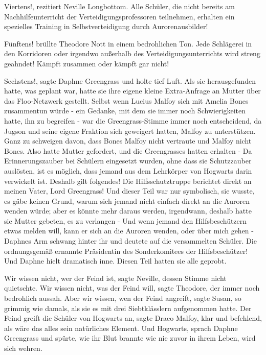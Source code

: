 \glqq{}Viertens!\grqq{}, rezitiert Neville Longbottom. \glqq{}Alle Schüler, die
nicht bereits am Nachhilfeunterricht der Verteidigungsprofessoren teilnehmen,
erhalten ein spezielles Training in Selbstverteidigung durch
Aurorenausbilder!\grqq{}

\glqq{}Fünftens!\grqq{} brüllte Theodore Nott in einem bedrohlichen Ton. \glqq{}
Jede Schlägerei in den Korridoren oder irgendwo außerhalb des
Verteidigungsunterrichts wird streng geahndet! Kämpft zusammen oder kämpft gar
nicht!\grqq{}

\glqq{}Sechstens!\grqq{}, sagte Daphne Greengrass und holte tief Luft. Als sie
herausgefunden hatte, was geplant war, hatte sie ihre eigene kleine
Extra-Anfrage an Mutter über das Floo-Netzwerk gestellt. Selbst wenn Lucius
Malfoy sich mit Amelia Bones zusammentun würde - ein Gedanke, mit dem sie immer
noch Schwierigkeiten hatte, ihn zu begreifen - war die Greengrass-Stimme immer
noch entscheidend, da Jugson und seine eigene Fraktion sich geweigert hatten,
Malfoy zu unterstützen. Ganz zu schweigen davon, dass Bones Malfoy nicht
vertraute und Malfoy nicht Bones. Also hatte Mutter gefordert, und die
Greengrasses hatten erhalten - \glqq{}Da Erinnerungszauber bei Schülern
eingesetzt wurden, ohne dass sie Schutzzauber auslösten, ist es möglich, dass
jemand aus dem Lehrkörper von Hogwarts darin verwickelt ist. Deshalb gilt
folgendes! Die Hilfsschutztruppe berichtet direkt an meinen Vater, Lord
Greengrass!\grqq{} Und dieser Teil war nur symbolisch, sie wusste, es gäbe
keinen Grund, warum sich jemand nicht einfach direkt an die Auroren wenden
würde; aber es könnte mehr daraus werden, irgendwann, deshalb hatte sie Mutter
gebeten, es zu verlangen - \glqq{}Und wenn jemand den Hilfsbeschützern etwas
melden will, kann er sich an die Auroren wenden, oder über mich gehen -\grqq{}
Daphnes Arm schwang hinter ihr und deutete auf die versammelten Schüler. \glqq{}
Die ordnungsgemäß ernannte Präsidentin des Sonderkomitees der
Hilfsbeschützer!\grqq{} Und Daphne hielt dramatisch inne. Diesen Teil hatten sie
alle geprobt.

\glqq{}Wir wissen nicht, wer der Feind ist\grqq{}, sagte Neville, dessen Stimme
nicht quietschte. \glqq{}Wir wissen nicht, was der Feind will\grqq{}, sagte
Theodore, der immer noch bedrohlich aussah. \glqq{}Aber wir wissen, wen der Feind
angreift\grqq{}, sagte Susan, so grimmig wie damals, als sie es mit drei
Siebtklässlern aufgenommen hatte. \glqq{}Der Feind greift die Schüler von
Hogwarts an\grqq{}, sagte Draco Malfoy, klar und befehlend, als wäre das alles
sein natürliches Element. \glqq{}Und Hogwarts\grqq{}, sprach Daphne Greengrass
und spürte, wie ihr Blut brannte wie nie zuvor in ihrem Leben, \glqq{}wird sich
wehren.\grqq{}

